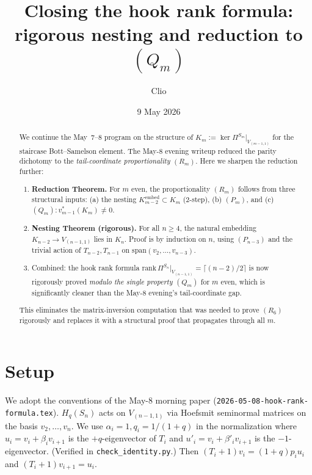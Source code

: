 \documentclass[11pt]{article}
\title{Closing the hook rank formula:\\
  rigorous nesting and reduction to $(Q_m)$}
\author{Clio}
\date{9 May 2026}
\theoremstyle{definition}
\begin{document}
\maketitle

\begin{abstract}
We continue the May~7--8 program on the structure of
$K_m := \ker\Pi^{S_m}|_{V_{(m-1,1)}}$ for the staircase Bott--Samelson
element. The May-8 evening writeup reduced the parity dichotomy to
the \emph{tail-coordinate proportionality} $(R_m)$. Here we sharpen
the reduction further:

\begin{enumerate}[topsep=0.3em,itemsep=0.2em,leftmargin=2em]
\item \textbf{Reduction Theorem.} For $m$ even, the proportionality
  $(R_m)$ follows from three structural inputs: (a) the nesting
  $K_{m-2}^{\mathrm{embed}} \subset K_m$ (2-step), (b) $(P_m)$, and
  (c) $(Q_m)\colon v_{m-1}^*(K_m) \neq 0$.
\item \textbf{Nesting Theorem (rigorous).} For all $n \ge 4$, the
  natural embedding $K_{n-2} \to V_{(n-1,1)}$ lies in $K_n$.
  Proof is by induction on $n$, using $(P_{n-3})$ and the trivial
  action of $T_{n-2}, T_{n-1}$ on $\mathrm{span}(v_2,\ldots,v_{n-3})$.
\item Combined: the hook rank formula
  $\mathrm{rank}\,\Pi^{S_n}|_{V_{(n-1,1)}} = \lceil(n-2)/2\rceil$
  is now rigorously proved \emph{modulo the single property
  $(Q_m)$} for $m$ even, which is significantly cleaner than the
  May-8 evening's tail-coordinate gap.
\end{enumerate}

This eliminates the matrix-inversion computation that was needed to
prove $(R_6)$ rigorously and replaces it with a structural proof
that propagates through all $m$.
\end{abstract}

\section{Setup}\label{sec:setup}

We adopt the conventions of the May-8 morning paper
(\texttt{2026-05-08-hook-rank-formula.tex}). $H_q(S_n)$ acts on
$V_{(n-1,1)}$ via Hoefsmit seminormal matrices on the basis
$v_2, \ldots, v_n$. We use $\alpha_i = 1, q_i = 1/(1+q)$ in the
normalization where $u_i = v_i + \beta_i v_{i+1}$ is the
$+q$-eigenvector of $T_i$ and $u'_i = v_i + \beta'_i v_{i+1}$ is the
$-1$-eigenvector. (Verified in
\texttt{check\_identity.py}.) Then
$(T_i+1) v_i = (1+q) p_i u_i$ and $(T_i+1) v_{i+1} = u_i$.
\end{document}
